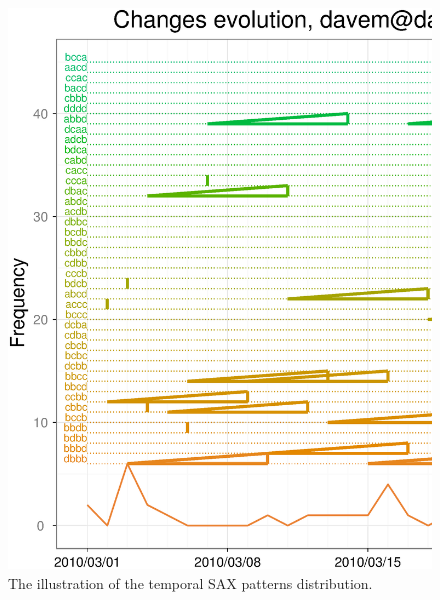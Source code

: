 \documentclass[a4paper,10pt]{article}
\numberwithin{equation}{subsection}
\begin{document}
\begin{figure}[h]
\noindent\begin{minipage}{\textwidth}
  \centering
  \includegraphics[width=\textwidth]{figures/march_fragment_w7p4a4.ps}
  \caption{The illustration of the temporal SAX patterns distribution.}
  \label{fig:march_patterns2}
\end{minipage}
\end{figure}
\end{document}
